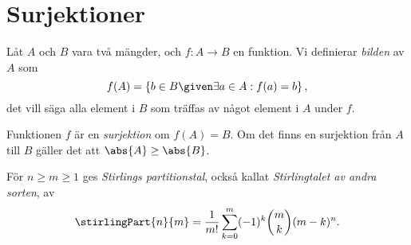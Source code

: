 \documentclass[nobib]{tufte-handout}
\begin{document}
\section{Surjektioner}

\begin{definition}
  Låt $A$ och $B$ vara två mängder, och $f: A \to B$ en funktion. Vi definierar \emph{bilden} av $A$ som
  $$f(A) = \left\{b \in B \given \exists a\in A: f(a) = b\right\},$$
  det vill säga alla element i $B$ som träffas av något element i $A$ under $f$.

  Funktionen $f$ är en \emph{surjektion} om $f(A) = B$. Om det finns en surjektion från $A$ till $B$ gäller det att $\abs{A} \geq \abs{B}$.
\end{definition}

\begin{definition}
  För $n \geq m \geq 1$ ges \emph{Stirlings partitionstal}, också kallat \emph{Stirlingtalet av andra sorten}, av
  $$\stirlingPart{n}{m} = \frac{1}{m!}\sum_{k=0}^{m}(-1)^k\binom{m}{k}(m-k)^n.$$
\end{definition}
\end{document}
